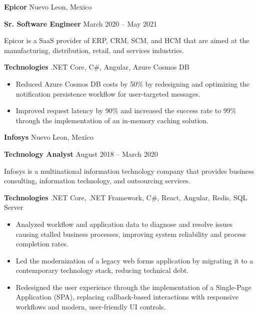 \documentclass[11pt]{article}
\begin{document}
\vspace{5pt}

\textbf{Epicor} \hfill Nuevo Leon, Mexico

\textbf{Sr. Software Engineer} \hfill March 2020 – May 2021

Epicor is a SaaS provider of ERP, CRM, SCM, and HCM that are aimed at the manufacturing, distribution, retail, and services industries.

\textbf{Technologies} .NET Core, C\#, Angular, Azure Cosmos DB
\begin{itemize}[noitemsep, topsep=0pt, partopsep=0pt, parsep=0pt]

    \item Reduced Azure Cosmos DB costs by 50\% by redesigning and optimizing the notification persistence workflow for user-targeted messages.
    \item Improved request latency by 90\% and increased the success rate to 99\% through the implementation of an in-memory caching solution.
    
\end{itemize}

\vspace{5pt}

\textbf{Infosys} \hfill Nuevo Leon, Mexico

\textbf{Technology Analyst} \hfill August 2018 – March 2020

Infosys is a multinational information technology company that provides business consulting, information technology, and outsourcing services.

\textbf{Technologies} .NET Core, .NET Framework, C\#, React, Angular, Redis, SQL Server
\begin{itemize}[noitemsep, topsep=0pt, partopsep=0pt, parsep=0pt]

    \item Analyzed workflow and application data to diagnose and resolve issues causing stalled business processes, improving system reliability and process completion rates.
    \item Led the modernization of a legacy web forms application by migrating it to a contemporary technology stack, reducing technical debt.
    \item Redesigned the user experience through the implementation of a Single-Page Application (SPA), replacing callback-based interactions with responsive workflows and modern, user-friendly UI controls.
    
\end{itemize}
\end{document}
